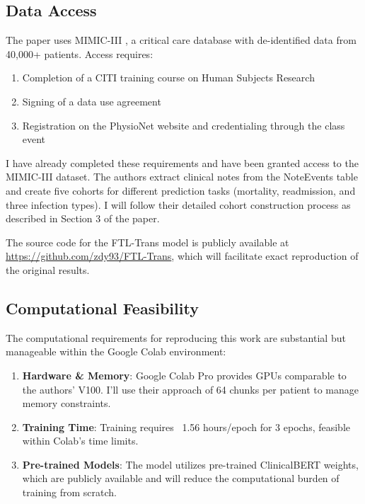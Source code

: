 \documentclass[10pt,letterpaper,twocolumn]{article}
\begin{document}
\subsection{Data Access}

The paper uses MIMIC-III \cite{johnson2016mimic}, a critical care database with de-identified data from 40,000+ patients. Access requires:

\begin{enumerate}[leftmargin=*]
    \item Completion of a CITI training course on Human Subjects Research
    \item Signing of a data use agreement
    \item Registration on the PhysioNet website and credentialing through the class event
\end{enumerate}

I have already completed these requirements and have been granted access to the MIMIC-III dataset. The authors extract clinical notes from the NoteEvents table and create five cohorts for different prediction tasks (mortality, readmission, and three infection types). I will follow their detailed cohort construction process as described in Section 3 of the paper.

The source code for the FTL-Trans model is publicly available at \url{https://github.com/zdy93/FTL-Trans}, which will facilitate exact reproduction of the original results.

\subsection{Computational Feasibility}

The computational requirements for reproducing this work are substantial but manageable within the Google Colab environment:

\begin{enumerate}[leftmargin=*]
	\item \textbf{Hardware \& Memory}: Google Colab Pro provides GPUs comparable to the authors' V100. I'll use their approach of 64 chunks per patient to manage memory constraints.
    
    \item \textbf{Training Time}: Training requires ~1.56 hours/epoch for 3 epochs, feasible within Colab's time limits.
    
    \item \textbf{Pre-trained Models}: The model utilizes pre-trained ClinicalBERT \cite{huang2019clinicalbert} weights, which are publicly available and will reduce the computational burden of training from scratch.
\end{enumerate}
\end{document}
